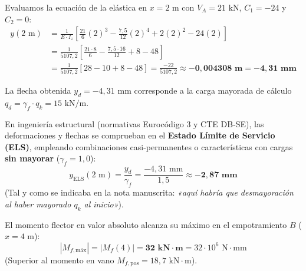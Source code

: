 
Evaluamos la ecuación de la elástica en $x = 2\text{ m}$ con $V_A = 21\text{ kN}$, $C_1 = -24$ y $C_2 = 0$:
\begin{align}
    y(2\text{ m}) & = \frac{1}{E \cdot I_z} \left[ \frac{21}{6}(2)^3 - \frac{7{,}5}{12}(2)^4 + 2(2)^2 - 24(2) \right] \nonumber \\
                  & = \frac{1}{5107{,}2} \left[ \frac{21 \cdot 8}{6} - \frac{7{,}5 \cdot 16}{12} + 8 - 48 \right] \nonumber \\
                  & = \frac{1}{5107{,}2} \left[ 28 - 10 + 8 - 48 \right] = \frac{-22}{5107{,}2} \approx \mathbf{-0{,}004308\text{ m} = -4{,}31\text{ mm}}
\end{align}

\begin{tcolorbox}[colback=yellow!10!white,colframe=orange!80!black,title=\textbf{Aclaración Rigurosa sobre Estados Límites (ELS vs ELU)}]
    La flecha obtenida $y_d = -4{,}31\text{ mm}$ corresponde a la carga mayorada de cálculo $q_d = \gamma_f \cdot q_k = 15\text{ kN/m}$.

    En ingeniería estructural (normativas Eurocódigo 3 y CTE DB-SE), las deformaciones y flechas se comprueban en el \textbf{Estado Límite de Servicio (ELS)}, empleando combinaciones casi-permanentes o características con cargas \textbf{sin mayorar} ($\gamma_f = 1{,}0$):
    \begin{equation}
        y_{\text{ELS}}(2\text{ m}) = \frac{y_d}{\gamma_f} = \frac{-4{,}31\text{ mm}}{1{,}5} \approx \mathbf{-2{,}87\text{ mm}}
    \end{equation}
    (Tal y como se indicaba en la nota manuscrita: \textit{«aquí habría que desmayoración al haber mayorado $q_k$ al inicio»}).
\end{tcolorbox}


El momento flector en valor absoluto alcanza su máximo en el empotramiento $B$ ($x = 4\text{ m}$):
\begin{equation}
    |M_{f,\text{máx}}| = |M_f(4)| = \mathbf{32\text{ kN}\cdot\text{m}} = 32 \cdot 10^6\text{ N}\cdot\text{mm}
\end{equation}
(Superior al momento en vano $M_{f,\text{pos}} = 18{,}7\text{ kN}\cdot\text{m}$).


